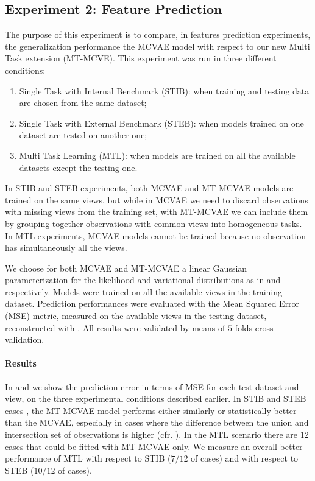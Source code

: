 \subsection{Experiment 2: Feature Prediction}
\label{ssec:feats}

The purpose of this experiment is to compare, in features prediction experiments, the generalization performance the MCVAE model with respect to our new Multi Task extension (MT-MCVE).
This experiment was run in three different conditions:
%
\begin{enumerate}
\item Single Task with Internal Benchmark (STIB): when training and testing data are chosen from the same dataset;
%
\item Single Task with External Benchmark (STEB): when models trained on one dataset are tested on another one;
%
\item Multi Task Learning (MTL): when models are trained on all the available datasets except the testing one.
%
\end{enumerate}
%
In STIB and STEB experiments, both MCVAE and MT-MCVAE models are trained on the same views,
but while in MCVAE we need to discard observations with missing views from the training set,
with MT-MCVAE we can include them by grouping together observations with common views into homogeneous tasks.
In MTL experiments, MCVAE models cannot be trained because no observation has simultaneously all the views.

We choose for both MCVAE and MT-MCVAE a linear Gaussian parameterization for the likelihood and variational distributions as in  and  respectively.
Models were trained on all the available views in the training dataset. %
Prediction performances were evaluated with the Mean Squared Error (MSE) metric, measured on the available views in the testing dataset, reconstructed with .
All results were validated by means of $5$-folds cross-validation.

\paragraph{Results}
In  and  we show the prediction error in terms of MSE for each test dataset and view, on the three experimental conditions described earlier.
In STIB and STEB cases , the MT-MCVAE model performs either similarly or statistically better than the MCVAE, especially in cases where the difference between the union and intersection set of observations is higher (cfr. ).
In the MTL scenario  there are $12$ cases that could be fitted with MT-MCVAE only.
We measure an overall better performance of MTL with respect to STIB ($7/12$ of cases) and with respect to STEB ($10/12$ of cases).


